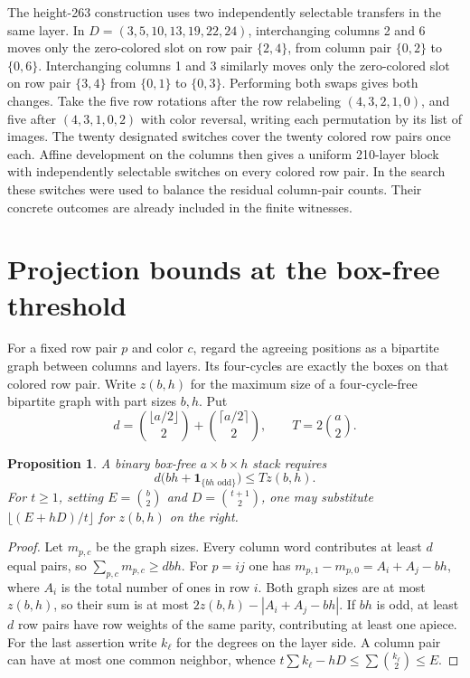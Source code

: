 \documentclass[11pt]{article}
\newtheorem{proposition}[theorem]{Proposition}
\newcommand{\one}{\mathbf 1}
\begin{document}
The height-263 construction uses two independently selectable transfers in the same layer. In $D=(3,5,10,13,19,22,24)$, interchanging columns 2 and 6 moves only the zero-colored slot on row pair $\{2,4\}$, from column pair $\{0,2\}$ to $\{0,6\}$. Interchanging columns 1 and 3 similarly moves only the zero-colored slot on row pair $\{3,4\}$ from $\{0,1\}$ to $\{0,3\}$. Performing both swaps gives both changes. Take the five row rotations after the row relabeling $(4,3,2,1,0)$, and five after $(4,3,1,0,2)$ with color reversal, writing each permutation by its list of images. The twenty designated switches cover the twenty colored row pairs once each. Affine development on the columns then gives a uniform 210-layer block with independently selectable switches on every colored row pair. In the search these switches were used to balance the residual column-pair counts. Their concrete outcomes are already included in the finite witnesses.

\section{Projection bounds at the box-free threshold}
For a fixed row pair $p$ and color $c$, regard the agreeing positions as a bipartite graph between columns and layers. Its four-cycles are exactly the boxes on that colored row pair. Write $z(b,h)$ for the maximum size of a four-cycle-free bipartite graph with part sizes $b,h$. Put
\[
 d=\binom{\lfloor a/2\rfloor}{2}+\binom{\lceil a/2\rceil}{2},
 \qquad T=2\binom a2 .
\]
\begin{proposition}\label{p:projection}
A binary box-free $a\times b\times h$ stack requires
\[
 d\bigl(bh+\one_{\{bh\text{ odd}\}}\bigr)\le Tz(b,h).
\]
For $t\ge1$, setting $E=\binom b2$ and $D=\binom{t+1}{2}$, one may substitute $\lfloor(E+hD)/t\rfloor$ for $z(b,h)$ on the right.
\end{proposition}
\begin{proof}
Let $m_{p,c}$ be the graph sizes. Every column word contributes at least $d$ equal pairs, so $\sum_{p,c}m_{p,c}\ge dbh$. For $p=ij$ one has $m_{p,1}-m_{p,0}=A_i+A_j-bh$, where $A_i$ is the total number of ones in row $i$. Both graph sizes are at most $z(b,h)$, so their sum is at most $2z(b,h)-|A_i+A_j-bh|$. If $bh$ is odd, at least $d$ row pairs have row weights of the same parity, contributing at least one apiece. For the last assertion write $k_\ell$ for the degrees on the layer side. A column pair can have at most one common neighbor, whence $t\sum k_\ell-hD\le\sum\binom{k_\ell}{2}\le E$.
\end{proof}
\end{document}
